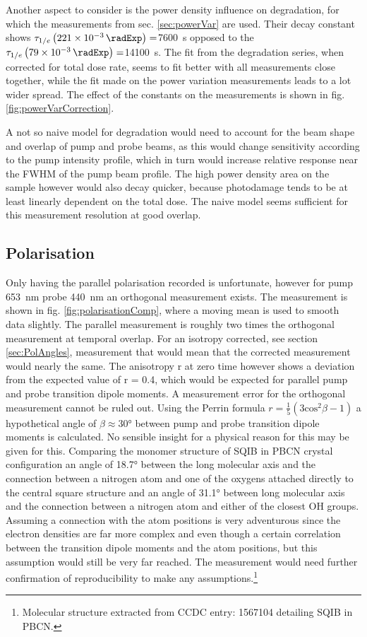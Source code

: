 \documentclass[twoside,openright]{scrreprt}
\begin{document}
Another aspect to consider is the power density influence on degradation, for which the measurements from sec. \ref{sec:powerVar} are used.  Their decay constant shows $\tau_{1/e}\left(\SI{221e-3}{\radExp}\right)=$\SI{7600}{\second}  opposed to the $\tau_{1/e}\left(\SI{79e-3}{\radExp}\right)=$\SI{14100}{\second}. The fit from the degradation series, when corrected for total dose rate, seems to fit better with all measurements close together, while the fit made on the power variation measurements leads to a lot wider spread. The effect of the constants on the measurements is shown in fig. \ref{fig:powerVarCorrection}.

A not so naive model for degradation would need to account for the beam shape and overlap of pump and probe beams, as this would change sensitivity according to the pump intensity profile, which in turn would increase relative response near the FWHM of the pump beam profile. The high power density area on the sample however would also decay quicker, because photodamage tends to be at least linearly dependent on the total dose. The naive model seems sufficient for this measurement resolution at good overlap.

\subsection{Polarisation}
Only having the parallel polarisation recorded is unfortunate, however for pump \SI{653}{\nano\meter} probe \SI{440}{\nano\meter} an orthogonal measurement exists. The measurement is shown in fig. \ref{fig:polarisationComp}, where a moving mean is used to smooth data slightly. The parallel measurement is roughly two times the orthogonal measurement at temporal overlap. For an isotropy corrected, see section \ref{sec:PolAngles}, measurement that would mean that the corrected measurement would nearly the same. The anisotropy r at zero time however shows a deviation from the expected value of r = 0.4, which would be expected for parallel pump and probe transition dipole moments. A measurement error for the orthogonal measurement cannot be ruled out. Using the Perrin formula $r = \frac{1}{5}(3\mathrm{cos}^2\beta-1)$ a hypothetical angle of $\beta \approx \ang{30}$ between pump and probe transition dipole moments is calculated. No sensible insight for a physical reason for this may be given for this. 
Comparing the monomer structure of SQIB in PBCN crystal configuration an angle of \ang{18.7} between the long molecular axis and the connection between a nitrogen atom and one of the oxygens attached directly to the central square structure and an angle of \ang{31.1} between long molecular axis and the connection between a nitrogen atom and either of the closest OH groups. Assuming a connection with the atom positions is very adventurous since the electron densities are far more complex and even though a certain correlation between the transition dipole moments and the atom positions, but this assumption would still be very far reached. The measurement would need further confirmation of reproducibility to make any assumptions.\footnote{Molecular structure extracted from CCDC entry: 1567104 detailing SQIB in PBCN.}
\end{document}
